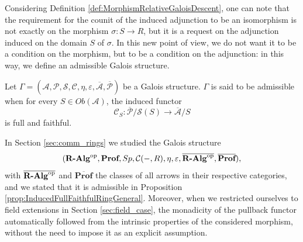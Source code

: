 Considering Definition \ref{def:MorphismRelativeGaloisDescent}, one can note that the requirement for the counit of the induced adjunction to be an isomorphism is not exactly on the morphism $\sigma:S\to R$, but it is a request on the adjunction induced on the domain $S$ of $\sigma$. In this new point of view, we do not want it to be a condition on the morphism, but to be a condition on the adjunction: in this way, we define an admissible Galois structure.
\begin{definition}
    Let $\Gamma = (\mathcal{A}, \mathcal{P}, \mathcal{S}, \mathcal{C}, \eta, \varepsilon, \overline{\mathcal{A}}, \overline{\mathcal{P}})$ be a Galois structure. $\Gamma$ is said to be admissible when for every $S\in Ob(\mathcal{A})$, the induced functor
    \[ \mathcal{C}_S:\overline{\mathcal{P}}/\mathcal{S}(S)\longrightarrow \overline{\mathcal{A}}/S \]
    is full and faithful.
\end{definition}

\begin{example}
    In Section \ref{sec:comm_rings} we studied the Galois structure
    \[ ({\textbf{R-Alg}}^{\mathrm{op}}, \textbf{Prof}, Sp, \mathcal{C}(-,R), \eta, \varepsilon, \overline{{\textbf{R-Alg}}^{\mathrm{op}}}, \overline{\textbf{Prof}}), \]
    with $\overline{{\textbf{R-Alg}}^{\mathrm{op}}}$ and $\overline{\textbf{Prof}}$ the classes of all arrows in their respective categories, and we stated that it is admissible in Proposition \ref{prop:InducedFullFaithfulRingGeneral}. Moreover, when we restricted ourselves to field extensions in Section \ref{sec:field_case}, the monadicity of the pullback functor automatically followed from the intrinsic properties of the considered morphism, without the need to impose it as an explicit assumption.
\end{example}

